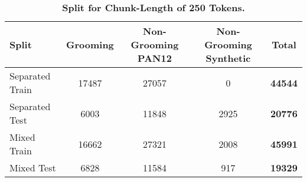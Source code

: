 \begin{table}[H]
\centering
\small
\begin{tabular}{lcccc}
\hline
Split & Grooming & Non-Grooming PAN12 & Non-Grooming Synthetic & \textbf{Total} \\
\hline
Separated Train & 17487 & 27057 & 0    & \textbf{44544} \\
Separated Test  &  6003 & 11848 & 2925 & \textbf{20776} \\
\midrule[\heavyrulewidth]
Mixed Train     & 16662 & 27321 & 2008 & \textbf{45991} \\
Mixed Test      &  6828 & 11584 & 917  & \textbf{19329} \\
\hline
\end{tabular}
\caption[Split for Chunk-Length of 250 Tokens]{\textbf{Split for Chunk-Length of 250 Tokens.}}
\end{table}
